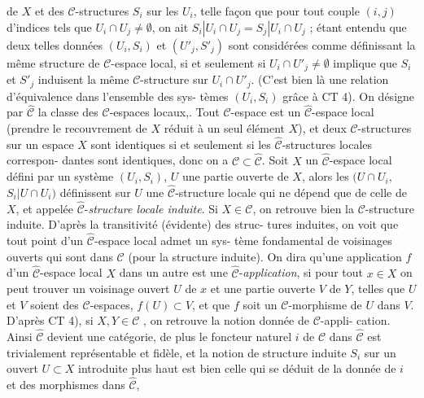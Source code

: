de $X$ et des $\mathcal{C}$-structures $S_i$ sur les $U_i$, telle façon que pour tout couple
$(i,j)$ d'indices tels que $U_i \cap U_j \neq \emptyset$, on ait $S_i | U_i \cap U_j = S_j | U_i \cap U_j$ ; étant
entendu que deux telles données $(U_i,S_i)$ et $(U'_j,S'_j)$ sont considérées comme
définissant la même structure de $\mathcal{C}$-espace local, si et seulement si
$U_i \cap U'_j \neq \emptyset$ implique que $S_i$ et $S'_j$ induisent la même $\mathcal{C}$-structure sur
$U_i \cap U'_j$. (C'est bien là une relation d'équivalence dans l'ensemble des sys-
tèmes $(U_i,S_i)$ grâce à CT 4). On désigne par $\hat{\mathcal{C}}$ la classe des $\mathcal{C}$-espaces
locaux,. Tout $\mathcal{C}$-espace est un $\hat{\mathcal{C}}$-espace local (prendre le recouvrement
de $X$ réduit à un seul élément $X$), et deux $\mathcal{C}$-structures sur un espace $X$
sont identiques si et seulement si les $\hat{\mathcal{C}}$-structures locales correspon-
dantes sont identiques, donc on a $\mathcal{C} \subset \hat{\mathcal{C}}$. Soit $X$ un $\hat{\mathcal{C}}$-espace local
défini par un système $(U_i,S_i)$, $U$ une partie ouverte de $X$, alors les $(U \cap U_i,$
$S_i | U \cap U_i)$ définissent sur $U$ une $\hat{\mathcal{C}}$-structure locale qui ne dépend que de
celle de $X$, et appelée $\hat{\mathcal{C}}$-\emph{structure locale induite}. Si $X \in \mathcal{C}$, on retrouve
bien la $\mathcal{C}$-structure induite. D'après la transitivité (évidente) des struc-
tures induites, on voit que tout point d'un $\hat{\mathcal{C}}$-espace local admet un sys-
tème fondamental de voisinages ouverts qui sont dans $\mathcal{C}$ (pour la structure
induite). On dira qu'une application $f$ d'un $\hat{\mathcal{C}}$-espace local $X$ dans un
autre est une $\hat{\mathcal{C}}$-\emph{application}, si pour tout $x \in X$ on peut trouver un
voisinage ouvert $U$ de $x$ et une partie ouverte $V$ de $Y$, telles que $U$ et $V$
soient des $\mathcal{C}$-espaces, $f(U) \subset V$, et que $f$ soit un $\mathcal{C}$-morphisme de $U$ dans
$V$. D'après CT 4), si $X,Y \in \mathcal{C}$ , on retrouve la notion donnée de $\mathcal{C}$-appli-
cation. Ainsi $\hat{\mathcal{C}}$ devient une catégorie, de plus le foncteur naturel $i$
de $\mathcal{C}$ dans $\hat{\mathcal{C}}$ est trivialement représentable et fidèle, et la notion de
structure induite $S_i$ sur un ouvert $U \subset X$ introduite plus haut est bien
celle qui se déduit de la donnée de $i$ et des morphismes dans $\hat{\mathcal{C}}$,

\newpage


